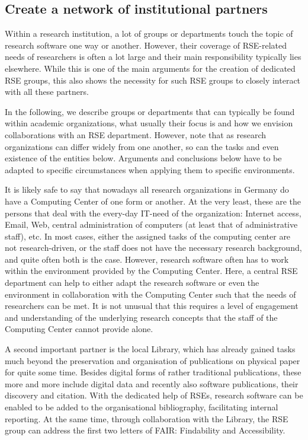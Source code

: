 \documentclass{article}
\begin{document}
\subsection{Create a network of institutional partners}

Within a research institution, a lot of groups or departments touch the topic of research software one way or another.
However, their coverage of RSE-related needs of researchers is often a lot large and their main responsibility typically lies elsewhere.
While this is one of the main arguments for the creation of dedicated RSE groups, this also shows the necessity for such RSE groups to closely interact with all these partners.

In the following, we describe groups or departments that can typically be found within academic organizations, what usually their focus is and how we envision collaborations with an RSE department. However, note that as research organizations can differ widely from one another, so can the tasks and even existence of the entities below.
Arguments and conclusions below have to be adapted to specific circumstances when applying them to specific environments.

It is likely safe to say that nowadays all research organizations in Germany do have a Computing Center of one form or another.
At the very least, these are the persons that deal with the every-day IT-need of the organization:
Internet access, Email, Web, central administration of computers (at least that of administrative staff), etc.
In most cases, either the assigned tasks of the computing center are not research-driven, or the staff does not have the necessary research background, and quite often both is the case.
However, research software often has to work within the environment provided by the Computing Center. Here, a central RSE department can help to either adapt the research software or even the environment in collaboration with the Computing Center such that the needs of researchers can be met. It is not unusual that this requires a level of engagement and understanding of the underlying research concepts that the staff of the Computing Center cannot provide alone.

A second important partner is the local Library, which has already gained tasks much beyond the preservation and organisation of publications on physical paper for quite some time.
Besides digital forms of rather traditional publications, these more and more include digital data and recently also software publications, their discovery and citation.
With the dedicated help of RSEs, research software can be enabled to be added to the organisational bibliography, facilitating internal reporting.
At the same time, through collaboration with the Library, the RSE group can address the first two letters of FAIR: Findability and Accessibility.
\end{document}
